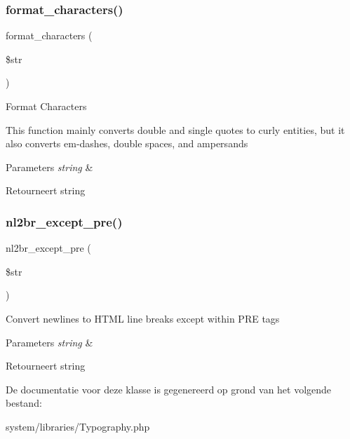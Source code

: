 \subsubsection{\texorpdfstring{format\_characters()}{format\_characters()}}
{\footnotesize\ttfamily format\+\_\+characters (\begin{DoxyParamCaption}\item[{}]{\$str }\end{DoxyParamCaption})}

Format Characters

This function mainly converts double and single quotes to curly entities, but it also converts em-\/dashes, double spaces, and ampersands


\begin{DoxyParams}{Parameters}
{\em string} & \\
\hline
\end{DoxyParams}
\begin{DoxyReturn}{Retourneert}
string 
\end{DoxyReturn}
\mbox{\label{class_c_i___typography_af9db9732eaa94a62b3a3ccc7f6bf860b}} 
\subsubsection{\texorpdfstring{nl2br\_except\_pre()}{nl2br\_except\_pre()}}
{\footnotesize\ttfamily nl2br\+\_\+except\+\_\+pre (\begin{DoxyParamCaption}\item[{}]{\$str }\end{DoxyParamCaption})}

Convert newlines to H\+T\+ML line breaks except within P\+RE tags


\begin{DoxyParams}{Parameters}
{\em string} & \\
\hline
\end{DoxyParams}
\begin{DoxyReturn}{Retourneert}
string 
\end{DoxyReturn}


De documentatie voor deze klasse is gegenereerd op grond van het volgende bestand\+:\begin{DoxyCompactItemize}
\item 
system/libraries/Typography.\+php\end{DoxyCompactItemize}
